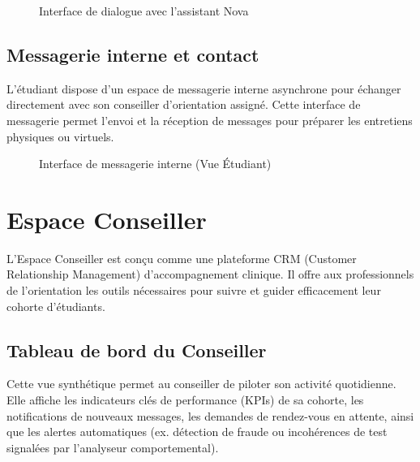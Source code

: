 \begin{figure}[H]
    \centering
    \caption{Interface de dialogue avec l'assistant Nova}
    \label{fig:interface_chatbot_nova}
\end{figure}

\subsection{Messagerie interne et contact}

L'étudiant dispose d'un espace de messagerie interne asynchrone pour échanger directement avec son conseiller d'orientation assigné. Cette interface de messagerie permet l'envoi et la réception de messages pour préparer les entretiens physiques ou virtuels.

\begin{figure}[H]
    \centering
    \caption{Interface de messagerie interne (Vue Étudiant)}
    \label{fig:interface_messagerie_etudiant}
\end{figure}

\section{Espace Conseiller}

L'Espace Conseiller est conçu comme une plateforme CRM (Customer Relationship Management) d'accompagnement clinique. Il offre aux professionnels de l'orientation les outils nécessaires pour suivre et guider efficacement leur cohorte d'étudiants.

\subsection{Tableau de bord du Conseiller}

Cette vue synthétique permet au conseiller de piloter son activité quotidienne. Elle affiche les indicateurs clés de performance (KPIs) de sa cohorte, les notifications de nouveaux messages, les demandes de rendez-vous en attente, ainsi que les alertes automatiques (ex. détection de fraude ou incohérences de test signalées par l'analyseur comportemental).


